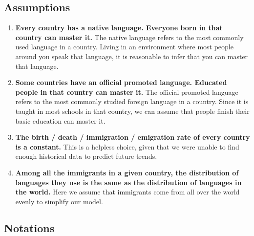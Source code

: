 \documentclass{mcmthesis}
\begin{document}
\subsection{Assumptions}
\begin{enumerate}
    \item \textbf{Every country has a native language. Everyone born in that country can master it.} The native language refers to the most commonly used language in a country. Living in an environment where most people around you speak that language, it is reasonable to infer that you can master that language.
    \item \textbf{Some countries have an official promoted language. Educated people in that country can master it.} The official promoted language refers to the most commonly studied foreign language in a country. Since it is taught in most schools in that country, we can assume that people finish their basic education can master it.
    \item \textbf{The birth / death / immigration / emigration rate of every country is a constant.} This is a helpless choice, given that we were unable to find enough historical data to predict future trends.
    \item \textbf{Among all the immigrants in a given country, the distribution of languages they use is the same as the distribution of languages in the world.} Here we assume that immigrants come from all over the world evenly to simplify our model.

\end{enumerate}
\subsection{Notations}
\end{document}
